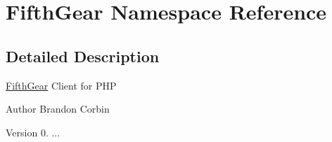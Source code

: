 \hypertarget{namespace_fifth_gear}{\section{Fifth\-Gear Namespace Reference}
\label{namespace_fifth_gear}
}


\subsection{Detailed Description}
\hyperlink{class_fifth_gear}{Fifth\-Gear} Client for P\-H\-P

\begin{DoxyAuthor}{Author}
Brandon Corbin 
\end{DoxyAuthor}
\begin{DoxyVersion}{Version}
0. ... 
\end{DoxyVersion}
